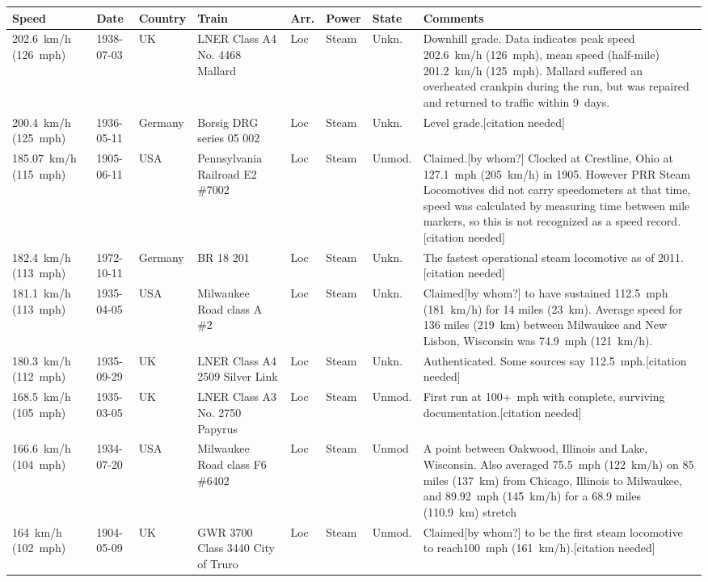 \documentclass{article}
\begin{document}
\begin{tabular}{llllllll}
\toprule
Speed & Date & Country & Train & Arr. & Power & State & Comments \\
\midrule
202.6 km/h (126 mph) & 1938-07-03 & UK & LNER Class A4 No. 4468 Mallard & Loc & Steam & Unkn. & Downhill grade. Data indicates peak speed 202.6 km/h (126 mph), mean speed (half-mile) 201.2 km/h (125 mph). Mallard suffered an overheated crankpin during the run, but was repaired and returned to traffic within 9 days. \\
200.4 km/h (125 mph) & 1936-05-11 & Germany & Borsig DRG series 05 002 & Loc & Steam & Unkn. & Level grade.[citation needed] \\
185.07 km/h (115 mph) & 1905-06-11 & USA & Pennsylvania Railroad E2 \#7002 & Loc & Steam & Unmod. & Claimed.[by whom?] Clocked at Crestline, Ohio at 127.1 mph (205 km/h) in 1905. However PRR Steam Locomotives did not carry speedometers at that time, speed was calculated by measuring time between mile markers, so this is not recognized as a speed record.[citation needed] \\
182.4 km/h (113 mph) & 1972-10-11 & Germany & BR 18 201 & Loc & Steam & Unkn. & The fastest operational steam locomotive as of 2011.[citation needed] \\
181.1 km/h (113 mph) & 1935-04-05 & USA & Milwaukee Road class A \#2 & Loc & Steam & Unkn. & Claimed[by whom?] to have sustained 112.5 mph (181 km/h) for 14 miles (23 km). Average speed for 136 miles (219 km) between Milwaukee and New Lisbon, Wisconsin was 74.9 mph (121 km/h). \\
180.3 km/h (112 mph) & 1935-09-29 & UK & LNER Class A4 2509 Silver Link & Loc & Steam & Unkn. & Authenticated. Some sources say 112.5 mph.[citation needed] \\
168.5 km/h (105 mph) & 1935-03-05 & UK & LNER Class A3 No. 2750 Papyrus & Loc & Steam & Unmod. & First run at 100+ mph with complete, surviving documentation.[citation needed] \\
166.6 km/h (104 mph) & 1934-07-20 & USA & Milwaukee Road class F6 \#6402 & Loc & Steam & Unmod & A point between Oakwood, Illinois and Lake, Wisconsin. Also averaged 75.5 mph (122 km/h) on 85 miles (137 km) from Chicago, Illinois to Milwaukee, and 89.92 mph (145 km/h) for a 68.9 miles (110.9 km) stretch \\
164 km/h (102 mph) & 1904-05-09 & UK & GWR 3700 Class 3440 City of Truro & Loc & Steam & Unmod. & Claimed[by whom?] to be the first steam locomotive to reach100 mph (161 km/h).[citation needed] \\

\end{tabular}
\end{document}
